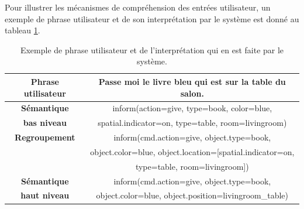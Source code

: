 \documentclass[a4paper,11pt,twoside]{StyleThese}
\begin{document}
Pour illustrer les mécanismes de compréhension des entrées utilisateur, un exemple de phrase utilisateur et de son interprétation par le système est donné au tableau \ref{table:fusion}.


\begin{table}
\centering
\renewcommand{\arraystretch}{1.3}
\begin{tabular}{|c|c|}
\hline
  \textbf{Phrase utilisateur} & Passe moi le livre bleu qui est sur la table du salon. \\
  \hline
  \textbf{Sémantique} & inform(action=give, type=book, color=blue, \\
  \textbf{bas niveau} & spatial.indicator=on, type=table, room=livingroom) \\
  \hline
 \textbf{Regroupement} & inform(cmd.action=give, object.type=book, \\
      & object.color=blue, object.location=[spatial.indicator=on, \\
      & type=table, room=livingroom]) \\
  \hline
  \textbf{Sémantique} & inform(cmd.action=give, object.type=book, \\
  \textbf{haut niveau} & object.color=blue, object.position=livingroom\_table) \\
  \hline
\end{tabular}
\caption{Exemple de phrase utilisateur et de l'interprétation qui en est faite par le système.}
 \label{table:fusion}
 \end{table}



\end{document}
